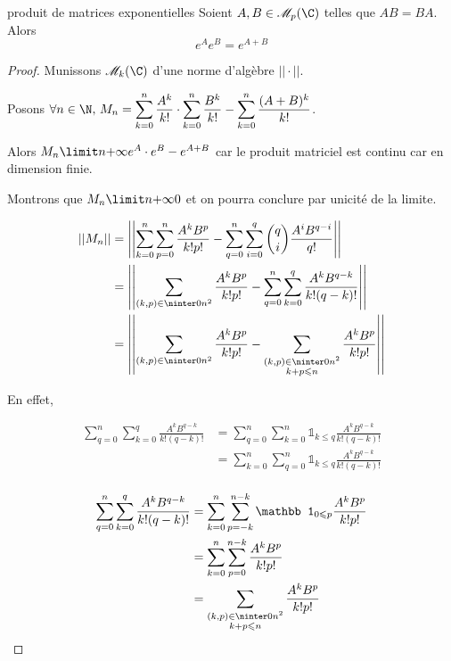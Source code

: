 \begin{corollaire}{produit de matrices exponentielles}{}
    Soient $A, B \in \mathscr M_p(\C)$ telles que $AB = BA$. 
    Alors 
    $$\displaystyle e^A e^B = e^{A + B}$$
\end{corollaire}

\begin{proof}
    Munissons $\mathscr M_k(\C)$ d'une norme d'algèbre $||\cdot||$. 

    Posons $\displaystyle \forall n \in \N, \, M_n = \sum_{k = 0 }^{n } \frac{A^k}{k!} \cdot \sum_{k = 0 }^{n } \frac{B^k}{k!} - \sum_{k = 0 }^{n }\frac{(A + B)^k}{k!}$.

    Alors $M_n \limit n {+ \infty} e^A \cdot e^B - e^{A + B}$ car le produit matriciel est continu
    car en dimension finie. 

    Montrons que $M_n \limit n {+ \infty} 0$ et on pourra conclure par unicité de la limite. 

    \begin{align*}
        ||M_n|| & = \left|\left| \sum_{k = 0 }^{n } \sum_{p = 0 }^{n } \frac{A^k B^p}{k! p!} - \sum_{q = 0}^n \sum_{i = 0 }^{q } \binom q i \frac{A^i B^{q - i}}{q!} \right|\right| \\
                & = \left|\left| \sum_{(k, p) \in \ninter 0 n^2} \frac{A^k B^p}{k! p!} - \sum_{q = 0}^n \sum_{k = 0}^q \frac{A^k B^{q - k}}{k! (q - k)!} \right|\right| \\
                & = \left|\left| \sum_{(k, p) \in \ninter 0 n^2} \frac{A^k B^p}{k! p!} - \sum_{\substack{(k, p) \in \ninter 0 n^2 \\ k + p \leqslant n}} \frac{A^k B^p}{k! p!} \right|\right| \\
    \end{align*}

    En effet,

    \begin{align*}
        \sum_{q = 0}^n \sum_{k = 0}^q \frac{A^k B^{q - k}}{k! (q - k)!} & = \sum_{q= 0}^n \sum_{k = 0}^n \mathbb 1_{k \leqslant q} \frac{A^k B^{q - k}}{k! (q - k)!} \\
         & = \sum_{k = 0}^n \sum_{q = 0}^n \mathbb 1_{k \leqslant q} \frac{A^k B^{q - k}}{k! (q - k)!} \\
    \end{align*}

    \begin{align*}
        \sum_{q = 0}^n \sum_{k = 0}^q \frac{A^k B^{q - k}}{k! (q - k)!} & = \sum_{ k = 0}^n \sum_{p = -k}^{n - k} \mathbb 1_{0 \leqslant p} \frac{A^k B^p}{k! p!} \\
         & = \sum_{ k = 0}^n \sum_{p = 0}^{n - k} \frac{A^k B^p}{k! p!} \\
         & = \sum_{\substack{(k, p) \in \ninter 0 n^2 \\ k + p \leqslant n}} \frac{A^k B^p}{k! p!} \\
    \end{align*}


\end{proof}
